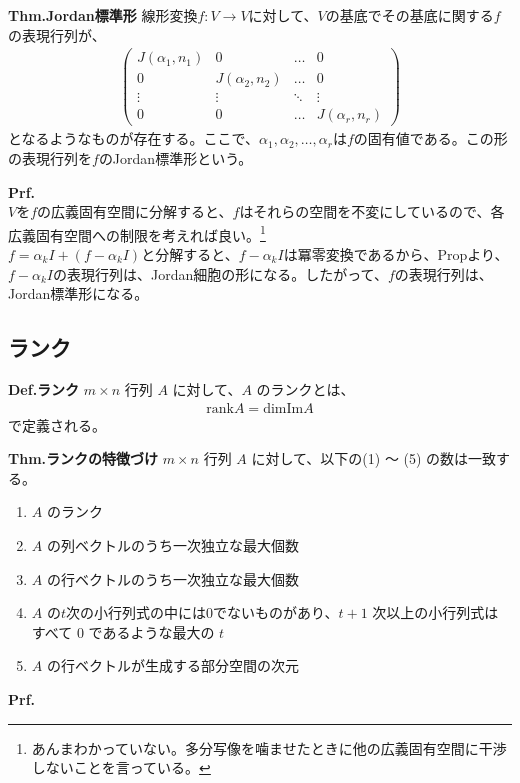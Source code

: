 \documentclass[a4paper,11pt]{jsarticle}
\numberwithin{equation}{section}
\begin{document}
\begin{itembox}[l]{\textbf{Thm.Jordan標準形}}
  線形変換$f: V \to V$に対して、$V$の基底でその基底に関する$f$の表現行列が、
  \begin{align}
    \begin{pmatrix}
      J(\alpha_1, n_1) & 0 & \dots & 0\\
      0 & J(\alpha_2, n_2) & \dots & 0\\
      \vdots & \vdots & \ddots & \vdots\\
      0 & 0 & \dots & J(\alpha_r, n_r)
    \end{pmatrix}
  \end{align}
  となるようなものが存在する。ここで、$\alpha_1, \alpha_2, \dots, \alpha_r$は$f$の固有値である。この形の表現行列を$f$のJordan標準形という。
\end{itembox}
\textbf{Prf.}\\
$V$を$f$の広義固有空間に分解すると、$f$はそれらの空間を不変にしているので、各広義固有空間への制限を考えれば良い。\footnote{あんまわかっていない。多分写像を噛ませたときに他の広義固有空間に干渉しないことを言っている。}\\
$f = \alpha_{k}I +(f-\alpha_{k}I)$と分解すると、$f-\alpha_{k}I$は冪零変換であるから、Propより、$f-\alpha_{k}I$の表現行列は、Jordan細胞の形になる。したがって、$f$の表現行列は、Jordan標準形になる。\hfill\qedsymbol\\

\subsection{ランク}
\begin{itembox}[l]{\textbf{Def.ランク}}
    $m \times n$ 行列 $A$ に対して、$A$ のランクとは、
    \begin{align}
        \text{rank} A = \text{dim} \text{Im} A
    \end{align}
    で定義される。
\end{itembox}
 
\begin{itembox}[l]{\textbf{Thm.ランクの特徴づけ}}
  $m \times n$ 行列 $A$ に対して、以下の(1) 〜 (5) の数は一致する。
  \begin{enumerate}
      \item $A$ のランク
      \item $A$ の列ベクトルのうち一次独立な最大個数
      \item $A$ の行ベクトルのうち一次独立な最大個数
      \item $A$ の$t$次の小行列式の中には$0$でないものがあり、$t+1$ 次以上の小行列式はすべて $0$ であるような最大の $t$
      \item $A$ の行ベクトルが生成する部分空間の次元
  \end{enumerate}
\end{itembox}
\textbf{Prf.}\\
\end{document}
